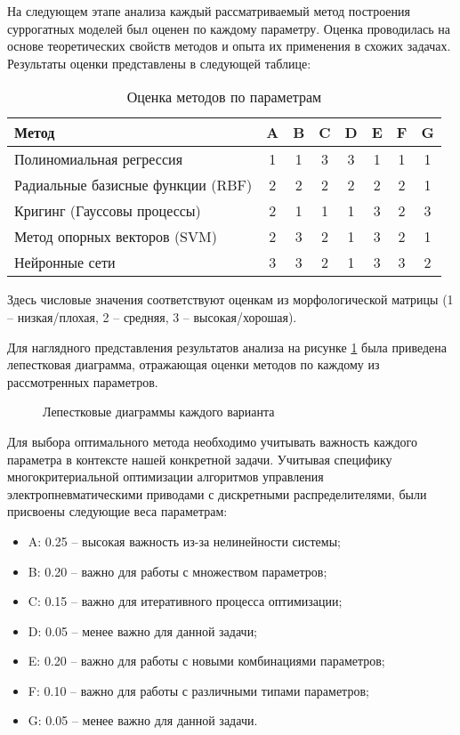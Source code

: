 На следующем этапе анализа каждый рассматриваемый метод
построения суррогатных моделей был оценен по каждому параметру.
Оценка проводилась на основе теоретических свойств методов и опыта
их применения в схожих задачах. Результаты оценки представлены в следующей таблице:

\begin{table}[h]
	\centering
	\caption{Оценка методов по параметрам}
	\begin{tabular}{l|c|c|c|c|c|c|c}
		\midrule
		Метод                             & A & B & C & D & E & F & G \\
		\midrule
		Полиномиальная регрессия          & 1 & 1 & 3 & 3 & 1 & 1 & 1 \\
		\hline
		Радиальные базисные функции (RBF) & 2 & 2 & 2 & 2 & 2 & 2 & 1 \\
		\hline
		Кригинг (Гауссовы процессы)       & 2 & 1 & 1 & 1 & 3 & 2 & 3 \\
		\hline
		Метод опорных векторов (SVM)      & 2 & 3 & 2 & 1 & 3 & 2 & 1 \\
		\hline
		Нейронные сети                    & 3 & 3 & 2 & 1 & 3 & 3 & 2 \\
		\midrule
	\end{tabular}
	\label{tab:method_evaluation}
\end{table}

Здесь числовые значения соответствуют оценкам из
морфологической матрицы (1 -- низкая/плохая, 2 -- средняя, 3 -- высокая/хорошая).

Для наглядного представления результатов анализа на рисунке \ref{fig:morphological_analysis}
была приведена лепестковая диаграмма, отражающая оценки методов по каждому из
рассмотренных параметров.

\begin{figure}[ht]
	\caption{Лепестковые диаграммы каждого варианта}\label{fig:morphological_analysis}
\end{figure}

Для выбора оптимального метода необходимо учитывать важность
каждого параметра в контексте нашей конкретной задачи.
Учитывая специфику многокритериальной оптимизации алгоритмов
управления электропневматическими приводами с дискретными
распределителями, были присвоены следующие веса параметрам:

\begin{itemize}
	\item A: 0.25 -- высокая важность из-за нелинейности системы;
	\item B: 0.20 -- важно для работы с множеством параметров;
	\item C: 0.15 -- важно для итеративного процесса оптимизации;
	\item D: 0.05 -- менее важно для данной задачи;
	\item E: 0.20 -- важно для работы с новыми комбинациями параметров;
	\item F: 0.10 -- важно для работы с различными типами параметров;
	\item G: 0.05 -- менее важно для данной задачи.
\end{itemize}

